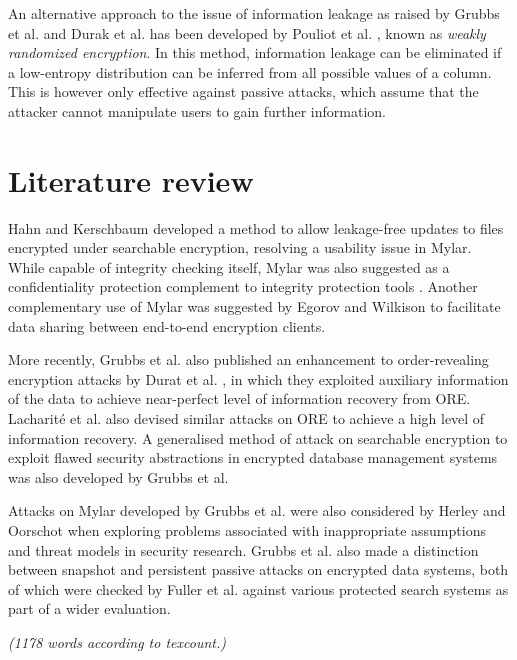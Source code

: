 \documentclass[11pt]{article}
\begin{document}
An alternative approach to the issue of information leakage as raised by Grubbs et al. \cite{grubbs2016breaking} and Durak et al. \cite{durak2016else} has been developed by Pouliot et al. \cite{pouliot2017strength}, known as \emph{weakly randomized encryption}. In this method, information leakage can be eliminated if a low-entropy distribution can be inferred from all possible values of a column. This is however only effective against passive attacks, which assume that the attacker cannot manipulate users to gain further information.

\section{Literature review}

Hahn and Kerschbaum \cite{hahn2014searchable} developed a method to allow leakage-free updates to files encrypted under searchable encryption, resolving a usability issue in Mylar. While capable of integrity checking itself, Mylar was also suggested as a confidentiality protection complement to integrity protection tools \cite{karapanos2016verena}. Another complementary use of Mylar was suggested by Egorov and Wilkison \cite{egorov2016zerodb} to facilitate data sharing between end-to-end encryption clients.

More recently, Grubbs et al. \cite{grubbs2017leakage} also published an enhancement to order-revealing encryption attacks by Durat et al. \cite[Sec. 4]{durak2016else}, in which they exploited auxiliary information of the data to achieve near-perfect level of information recovery from ORE. Lacharit{\'e} et al. \cite{lacharite2017improved} also devised similar attacks on ORE to achieve a high level of information recovery. A generalised method of attack on searchable encryption to exploit flawed security abstractions in encrypted database management systems was also developed \cite{grubbs2017your} by Grubbs et al.

Attacks on Mylar developed by Grubbs et al. \cite{grubbs2016breaking} were also considered by Herley and Oorschot \cite{herley2017sok} when exploring problems associated with inappropriate assumptions and threat models in security research. Grubbs et al. also made a distinction between snapshot and persistent passive attacks on encrypted data systems, both of which were checked by Fuller et al. \cite{fuller2017sok} against various protected search systems as part of a wider evaluation.

\emph{(1178 words according to texcount.)}


\footnotesize{}
\end{document}

